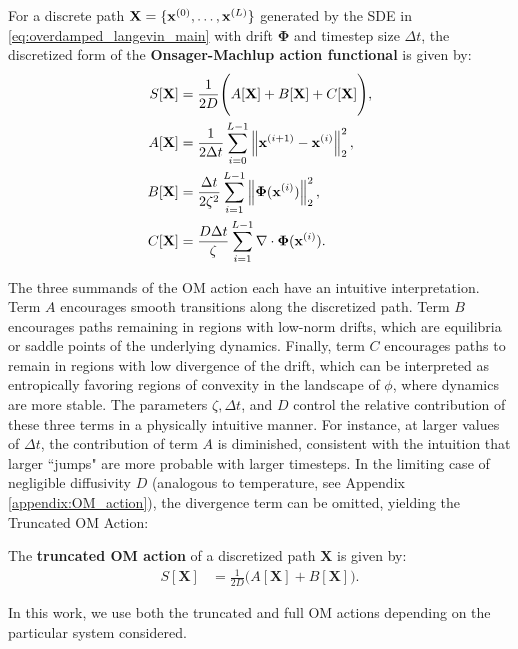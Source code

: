 \begin{tcolorbox}[colback=cyan!15!white, boxrule=0.1mm, arc=1mm]
\begin{definition}
For a discrete path $\mathbf{X} = \{\mathbf{x}^{(0)}, \dots, \mathbf{x}^{(L)}\}$ generated by the SDE in \eqref{eq:overdamped_langevin_main} with drift $\mathbf{\Phi}$ and timestep size $\Delta t$, the discretized form of the \textbf{Onsager-Machlup action functional} is given by: 
\vspace{-2ex}
\begin{align}
\begin{split}
\label{eq:final_OM}
    S[\mathbf{X}] &= \frac{1}{2D} \Bigg(A[\mathbf{X}]
    + B[\mathbf{X}] +  C[\mathbf{X}] \Bigg), \\
    A[\mathbf{X}] &= \frac{1}{2\Delta t} \sum_{i=0}^{L-1} \left\|\mathbf{x}^{(i+1)} - \mathbf{x}^{(i)} \right\|_2^2, \\ 
    B[\mathbf{X}] &= \frac{\Delta t}{2\zeta^2} \sum_{i=1}^{L-1} \left\|\mathbf{\Phi}(\mathbf{x}^{(i)})\right\|_2^2, \\ 
    C[\mathbf{X}] &= \frac{D\Delta t}{\zeta} \sum_{i=1}^{L-1} \nabla \cdot \mathbf{\Phi}(\mathbf{x}^{(i)}).
\end{split}
\end{align}
\end{definition}
\end{tcolorbox}
The three summands of the OM action each have an intuitive interpretation. Term $A$ encourages smooth transitions along the discretized path. Term $B$ encourages paths remaining in regions with low-norm drifts, which are equilibria or saddle points of the underlying dynamics. Finally, term $C$ encourages paths to remain in regions with low divergence of the drift, which can be interpreted as entropically favoring regions of convexity in the landscape of $\phi$, where dynamics are more stable. The parameters $\zeta, \Delta t$, and $D$ control the relative contribution of these three terms in a physically intuitive manner. For instance, at larger values of $\Delta t$, the contribution of term $A$ is diminished, consistent with the intuition that larger ``jumps" are more probable with larger timesteps. In the limiting case of negligible diffusivity $D$ (analogous to temperature, see Appendix \ref{appendix:OM_action}), the divergence term can be omitted, yielding the Truncated OM Action:
\begin{tcolorbox}[colback=cyan!15!white, colframe=black, boxrule=0.1mm, arc=1mm]
\begin{definition}
The \textbf{truncated OM action} of a discretized path $\mathbf{X}$ is given by:
\begin{align}
\label{eq:final_OM_truncated}
S[\mathbf{X}] &= \frac{1}{2D} \big( A[\mathbf{X}] + B[\mathbf{X}] \big).
\end{align}
\end{definition}
\end{tcolorbox}
In this work, we use both the truncated and full OM actions depending on the particular system considered.  
\vspace{-3pt}
